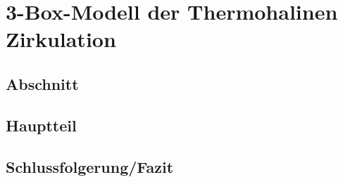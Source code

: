 %
%
%
\chapter{3-Box-Modell der Thermohalinen Zirkulation\label{chapter:thermohalin}}
\begin{refsection}

\section{Abschnitt}

\section{Hauptteil}

\section{Schlussfolgerung/Fazit}

\printbibliography[heading=subbibliography]
\end{refsection}

